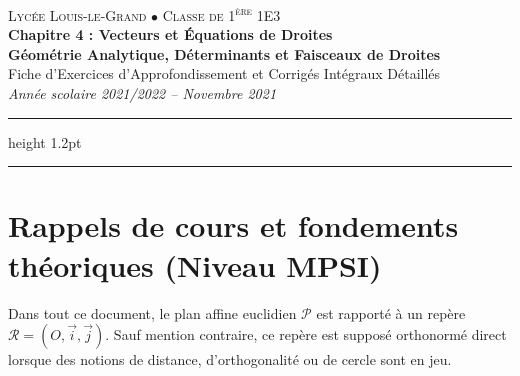 \documentclass[11pt,a4paper]{article}
\begin{document}
\begin{center}
    {\scshape\Large Lycée Louis-le-Grand \quad $\bullet$ \quad Classe de 1\textsuperscript{ère} 1E3}\\[0.3cm]
    {\huge\bfseries\color{primaryblue} Chapitre 4 : Vecteurs et Équations de Droites}\\[0.2cm]
    {\Large\bfseries Géométrie Analytique, Déterminants et Faisceaux de Droites}\\[0.3cm]
    {\large Fiche d'Exercices d'Approfondissement et Corrigés Intégraux Détaillés}\\[0.2cm]
    \textit{Année scolaire 2021/2022 -- Novembre 2021}
\end{center}

\vspace{0.3cm}
\hrule height 1.2pt
\vspace{0.5cm}

\tableofcontents

\vspace{0.5cm}
\hrule
\vspace{0.8cm}

\section{Rappels de cours et fondements théoriques (Niveau MPSI)}

Dans tout ce document, le plan affine euclidien $\mathscr{P}$ est rapporté à un repère $\mathcal{R} = (O, \vec{i}, \vec{j})$. Sauf mention contraire, ce repère est supposé orthonormé direct lorsque des notions de distance, d'orthogonalité ou de cercle sont en jeu.
\end{document}
